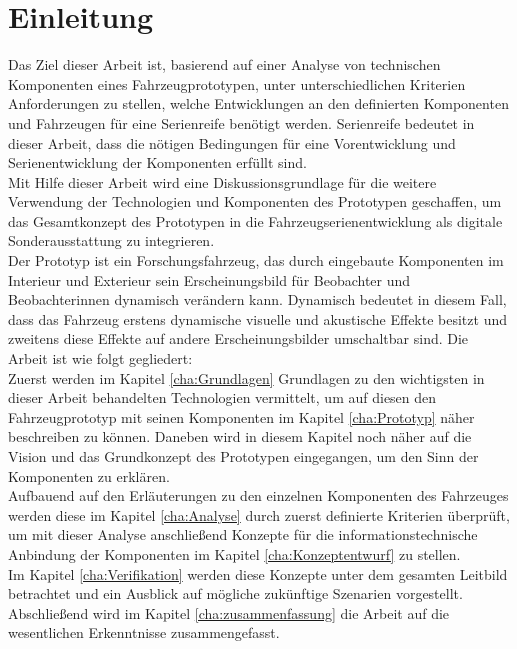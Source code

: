 \chapter{Einleitung}
\label{cha:Einleitung}
Das Ziel dieser Arbeit ist, basierend auf einer Analyse von technischen Komponenten eines Fahrzeugprototypen, unter unterschiedlichen Kriterien Anforderungen zu stellen, welche Entwicklungen an den definierten Komponenten und Fahrzeugen für eine Serienreife benötigt werden. Serienreife bedeutet in dieser Arbeit, dass die nötigen Bedingungen für eine Vorentwicklung und Serienentwicklung der Komponenten erfüllt sind.\\
Mit Hilfe dieser Arbeit wird eine Diskussionsgrundlage für die weitere Verwendung der Technologien und Komponenten des Prototypen geschaffen, um das Gesamtkonzept des Prototypen in die Fahrzeugserienentwicklung als digitale Sonderausstattung zu integrieren.\\
Der Prototyp ist ein Forschungsfahrzeug, das durch eingebaute Komponenten im Interieur und Exterieur sein Erscheinungsbild für Beobachter und Beobachterinnen dynamisch verändern kann. Dynamisch bedeutet in diesem Fall, dass das Fahrzeug erstens dynamische visuelle und akustische Effekte besitzt und zweitens diese Effekte auf andere Erscheinungsbilder umschaltbar sind.
Die Arbeit ist wie folgt gegliedert:\\
Zuerst werden im Kapitel \ref{cha:Grundlagen} Grundlagen zu den wichtigsten in dieser Arbeit behandelten Technologien vermittelt, um auf diesen den Fahrzeugprototyp mit seinen Komponenten im Kapitel \ref{cha:Prototyp} näher beschreiben zu können. Daneben wird in diesem Kapitel noch näher auf die Vision und das Grundkonzept des Prototypen eingegangen, um den Sinn der Komponenten zu erklären.\\
Aufbauend auf den Erläuterungen zu den einzelnen Komponenten des Fahrzeuges werden diese im Kapitel \ref{cha:Analyse} durch zuerst definierte Kriterien überprüft, um mit dieser Analyse anschließend Konzepte für die informationstechnische Anbindung der Komponenten im Kapitel \ref{cha:Konzeptentwurf} zu stellen.\\
Im Kapitel \ref{cha:Verifikation} werden diese Konzepte unter dem gesamten Leitbild betrachtet und ein Ausblick auf mögliche zukünftige Szenarien vorgestellt. Abschließend wird im Kapitel \ref{cha:zusammenfassung} die Arbeit auf die wesentlichen Erkenntnisse zusammengefasst.